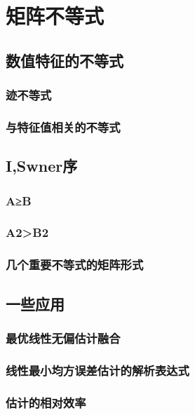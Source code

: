 \chapter{矩阵不等式}
\label{cha:矩阵不等式}

\section{数值特征的不等式}
\label{sec:数值特征的不等式}

\subsection{迹不等式}
\label{sub:迹不等式}

\subsection{与特征值相关的不等式}
\label{sub:与特征值相关的不等式}

\section{I,Swner序}
\label{sec:I,Swner序}

\subsection{A≥B}
\label{sub:A≥B}

\subsection{A2>B2}
\label{sub:A2>B2}

\subsection{几个重要不等式的矩阵形式}
\label{sub:几个重要不等式的矩阵形式}

\section{一些应用}
\label{sec:一些应用}

\subsection{最优线性无偏估计融合}
\label{sub:最优线性无偏估计融合}

\subsection{线性最小均方误差估计的解析表达式}
\label{sub:线性最小均方误差估计的解析表达式}

\subsection{估计的相对效率}
\label{sub:估计的相对效率}


